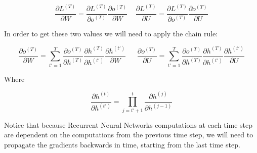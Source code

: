 $$ \frac{\partial L^{(T)}}{\partial W } =  \frac{\partial L^{(T)}}{\partial o^{(T)} } \frac{\partial o^{(T)}}{\partial W } ~~~~~ \frac{\partial L^{(T)}}{\partial U } =  \frac{\partial L^{(T)}}{\partial o^{(T)} } \frac{\partial o^{(T)}}{\partial U }
$$

\newpage
\noindent In order to get these two values we will need to apply the chain rule:

$$ \frac{\partial o^{(T)}}{\partial W} = \sum_{t'=1}^{T} \frac{\partial o^{(T)}}{\partial h^{(T)}} \frac{\partial h^{(T)}}{\partial h^{(t')}} \frac{\partial h^{(t')}}{\partial W} ~~~~~~~ \frac{\partial o^{(T)}}{\partial U} = \sum_{t'=1}^{T} \frac{\partial o^{(T)}}{\partial h^{(T)}} \frac{\partial h^{(T)}}{\partial h^{(t')}} \frac{\partial h^{(t')}}{\partial U} $$

\noindent Where

$$ \frac{\partial h^{(t)}}{\partial h^{(t')}} = \prod_{j=t'+1}^{t} \frac{\partial h^{(j)}}{\partial h^{(j-1)}}$$

\begin{figure}[h]
\centering     %
{}
\end{figure}


\noindent Notice that because Recurrent Neural Networks computations at each time step are dependent on the computations from the previous time step, we will need to propagate the gradients backwards in time, starting from the last time step.

